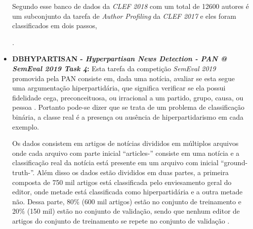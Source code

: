 \begin{itemize}
        Segundo  esse banco de dados da \textit{CLEF 2018} com um total de 12600 autores é um subconjunto da tarefa de \textit{Author Profiling} da \textit{CLEF 2017} e eles foram classificados em dois passos,
        \cite{rangel2017overview}.
        
        
        \item \textbf{DB\underscore{}HYPARTISAN - \textit{Hyperpartisan News Detection - PAN @ SemEval 2019 Task 4}:} Esta tarefa da competição \textit{SemEval 2019} promovida pela PAN consiste em, dada uma notícia, avaliar se esta segue uma argumentação hiperpartidária, que significa verificar se ela possui fidelidade cega, preconceituosa, ou irracional a um partido, grupo, causa, ou pessoa \cite{PAN_HND_2019}.
        Portanto pode-se dizer que se trata de um problema de classificação binária, a classe real é a presença ou ausência de hiperpartidarismo em cada exemplo.
        
        Os dados consistem em artigos de notícias divididos em múltiplos arquivos onde cada arquivo com parte inicial ``articles-'' consiste em uma notícia e a classificação real da notícia está presente em um arquivo com inicial ``ground-truth-''. 
        Além disso os dados estão divididos em duas partes, a primeira composta de 750 mil artigos está classificada pelo enviesamento geral do editor, onde metade está classificada como hiperpartidária e a outra metade não. 
        Dessa parte, 80\% (600 mil artigos) estão no conjunto de treinamento e 20\% (150 mil) estão no conjunto de validação, sendo que nenhum editor de artigos do conjunto de treinamento se repete no conjunto de validação \cite{johannes_kiesel_2018_1489920}.
        

\end{itemize}
